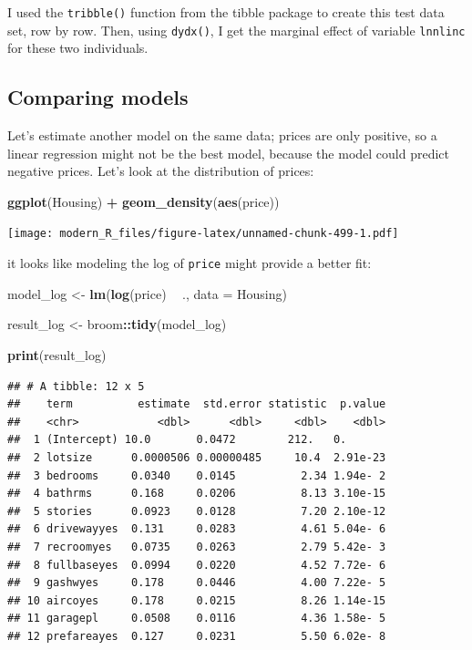 \documentclass[]{gitbook}
\newenvironment{Shaded}{\begin{snugshade}}{\end{snugshade}}
\newcommand{\DataTypeTok}[1]{\textcolor[rgb]{0.13,0.29,0.53}{#1}}
\newcommand{\KeywordTok}[1]{\textcolor[rgb]{0.13,0.29,0.53}{\textbf{#1}}}
\newcommand{\NormalTok}[1]{#1}
\newcommand{\OperatorTok}[1]{\textcolor[rgb]{0.81,0.36,0.00}{\textbf{#1}}}
\newcommand{\StringTok}[1]{\textcolor[rgb]{0.31,0.60,0.02}{#1}}
\begin{document}
I used the \texttt{tribble()} function from the tibble package to create this test data set, row by row.
Then, using \texttt{dydx()}, I get the marginal effect of variable \texttt{lnnlinc} for these two individuals.

\hypertarget{comparing-models}{%
\subsection{Comparing models}\label{comparing-models}}

Let's estimate another model on the same data; prices are only positive, so a linear regression
might not be the best model, because the model could predict negative prices. Let's look at the
distribution of prices:

\begin{Shaded}
\begin{Highlighting}[]
\KeywordTok{ggplot}\NormalTok{(Housing) }\OperatorTok{+}
\StringTok{  }\KeywordTok{geom_density}\NormalTok{(}\KeywordTok{aes}\NormalTok{(price))}
\end{Highlighting}
\end{Shaded}

\texttt{[image: modern\_R\_files/figure-latex/unnamed-chunk-499-1.pdf]}

it looks like modeling the log of \texttt{price} might provide a better fit:

\begin{Shaded}
\begin{Highlighting}[]
\NormalTok{model_log <-}\StringTok{ }\KeywordTok{lm}\NormalTok{(}\KeywordTok{log}\NormalTok{(price) }\OperatorTok{~}\StringTok{ }\NormalTok{., }\DataTypeTok{data =}\NormalTok{ Housing)}

\NormalTok{result_log <-}\StringTok{ }\NormalTok{broom}\OperatorTok{::}\KeywordTok{tidy}\NormalTok{(model_log)}

\KeywordTok{print}\NormalTok{(result_log)}
\end{Highlighting}
\end{Shaded}

\begin{verbatim}
## # A tibble: 12 x 5
##    term          estimate  std.error statistic  p.value
##    <chr>            <dbl>      <dbl>     <dbl>    <dbl>
##  1 (Intercept) 10.0       0.0472        212.   0.      
##  2 lotsize      0.0000506 0.00000485     10.4  2.91e-23
##  3 bedrooms     0.0340    0.0145          2.34 1.94e- 2
##  4 bathrms      0.168     0.0206          8.13 3.10e-15
##  5 stories      0.0923    0.0128          7.20 2.10e-12
##  6 drivewayyes  0.131     0.0283          4.61 5.04e- 6
##  7 recroomyes   0.0735    0.0263          2.79 5.42e- 3
##  8 fullbaseyes  0.0994    0.0220          4.52 7.72e- 6
##  9 gashwyes     0.178     0.0446          4.00 7.22e- 5
## 10 aircoyes     0.178     0.0215          8.26 1.14e-15
## 11 garagepl     0.0508    0.0116          4.36 1.58e- 5
## 12 prefareayes  0.127     0.0231          5.50 6.02e- 8
\end{verbatim}
\end{document}
